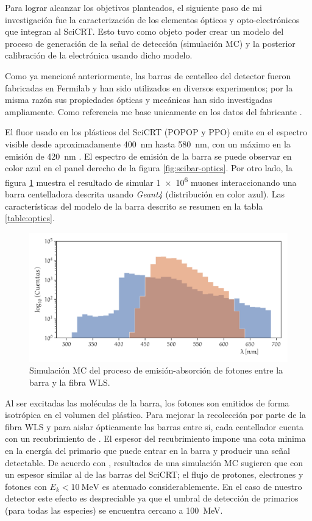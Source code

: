 Para lograr alcanzar los objetivos planteados, el siguiente paso de mi investigación fue la caracterización de los elementos ópticos y opto-electrónicos que integran al SciCRT. Esto tuvo como objeto poder crear un modelo del proceso de generación de la señal de detección (simulación MC) y la posterior calibración de la electrónica usando dicho modelo.

Como ya mencioné anteriormente, las barras de centelleo del detector fueron fabricadas en Fermilab y han sido utilizados en diversos experimentos; por la misma razón sus propiedades ópticas y mecánicas han sido investigadas ampliamente. Como referencia me base unicamente en los datos del fabricante \cite{beznosko}.

El fluor usado en los plásticos del SciCRT (POPOP y PPO) emite en el espectro visible desde aproximadamente \SI{400}{\nano\metre} hasta \SI{580}{\nano\metre}, con un máximo en la emisión de \SI{420}{\nano\metre} \cite{kikawa14}. El espectro de emisión de la barra se puede observar en color azul en el panel derecho de la figura \ref{fig:scibar-optics}. Por otro lado, la figura \ref{fig:sim-optics} muestra el resultado de simular \num{1e6} muones interaccionando una barra centelladora descrita usando \emph{Geant4} \cite{geant403,geant406} (distribución en color azul). Las características del modelo de la barra descrito se resumen en la tabla \ref{table:optics}.

\begin{figure}
        \centering
        \includegraphics[width=\textwidth]{sim-optics-spect.pdf}
        \caption{Simulación MC del proceso de emisión-absorción de fotones entre la barra y la fibra WLS.}
        \label{fig:sim-optics}
\end{figure}

Al ser excitadas las moléculas de la barra, los fotones son emitidos de forma isotrópica en el volumen del plástico. Para mejorar la recolección por parte de la fibra WLS y para aislar ópticamente las barras entre si, cada centellador cuenta con un recubrimiento de . El espesor del recubrimiento impone una cota minima en la energía del primario que puede entrar en la barra y producir una señal detectable. De acuerdo con \cite{gros18}, resultados de una simulación MC sugieren que con un espesor similar al de las barras del SciCRT; el flujo de protones, electrones y fotones con $E_{k}<\SI{10}{\mega\electronvolt}$ es atenuado considerablemente. En el caso de nuestro detector este efecto es despreciable ya que el umbral de detección de primarios (para todas las especies) se encuentra cercano a \SI{100}{\mega\electronvolt}.

